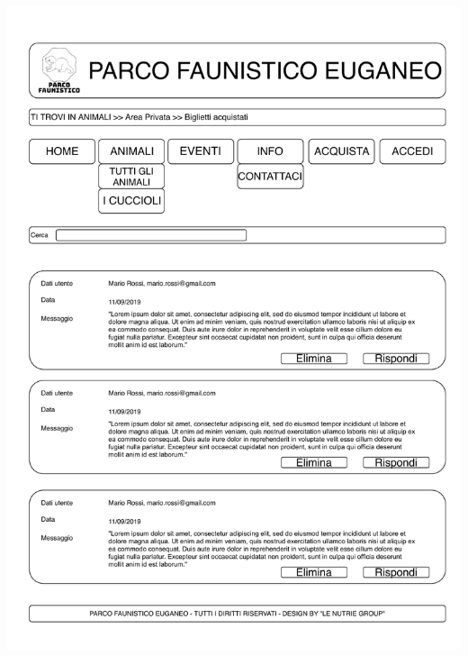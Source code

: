 \begin{center}
\begin{minipage}{0.4\linewidth}
            \includegraphics[width=\linewidth]{./../docs/Analisi/bozze/Messaggi.pdf}
        \end{minipage}%
        \hfill
        \begin{minipage}{0.4\linewidth}

\end{minipage}
\end{center}
